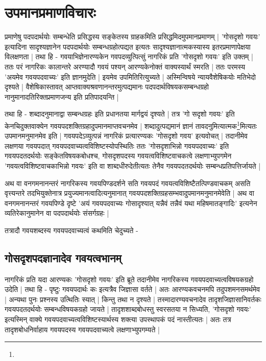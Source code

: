 \section{उपमानप्रमाणविचारः}

प्रमाणेषु पदपदार्थयोः सम्बन्धेति प्रसिद्धस्य सङ्केतस्य ग्राहकमिति प्रसिद्धमिदमुपमानप्रमाणम् | 'गोसदृशो गवयः' इत्यादिना सादृश्यज्ञानेन पदपदार्थयोः सम्बन्धग्रहोत्पद्यत इत्यतः सादृश्यज्ञानात्मकस्यास्य इतरप्रमाणापेक्षया विलक्षणता | तथा हि - गवयाभिज्ञेनारण्यकेन गवपदव्युत्पित्सुं नागरिकं प्रति 'गोसदृशो गवयः' इति उक्तम् | ततः परं नागरिकः कालान्तरे अरण्यादौ गवयं पश्यन् आरण्यकेनोक्तं वाक्यस्यार्थं स्मरति | ततः परमस्य 'अयमेव गवयपदवाच्यः' इति ज्ञानमुदेति | इयमेव उपमितिरित्युच्यते | अस्मिन्विषये न्यायवैशेषिकयोः मतिभेदो दृश्यते | वैशेषिकास्तावत् आप्तवाक्यश्रवणानन्तरमुत्पद्यमानः पदपदार्थविषयकसम्बन्धग्रहो नानुमानादतिरिक्तप्रमाणजन्य इति प्रतिपादयन्ति |

तथा हि - शब्दादनुमानाद्वा सम्बन्धग्रहः इति प्रधानतया मार्गद्वयं दृश्यते | तत्र 'गो सदृशो गवयः' इति केनचिदुक्तवाक्येन गवयपदशक्तिग्रहादुपमानमाप्तवचनमेव | शब्दादुत्पद्यमानं ज्ञानं तावदनुमित्यात्मक\footnote{}मित्यतः उपमानमनुमानमेव इति | गवयपदेऽव्युत्पन्नं नागरिकं प्रत्यारण्यकः 'गोसदृशो गवय' इत्यवोचत् | तदानीमेव लक्षणया गवयपदात् गवयपदवाच्यत्वविशिष्टस्योपस्थितिः ततः  'गोसदृशाभिन्नो गवयपदवाच्यः' इति गवयपदतदर्थयोः सङ्केतविषयकबोधश्च, गोसदृशपदस्य गवयत्वविशिष्टवाचकत्वे लक्षणाभ्युपगमेन 'गवयत्वविशिष्टवाचकाभिन्नो गवयः' इति वा शाब्दधीरुदेतीत्यतः तेनैव गवयपदतदर्थयोः सम्बन्धप्रतिपत्तिर्जायते  |

अथ वा वनगमनानन्तरं नागरिकस्य गवयपिण्डदर्शने सति गवयपदं गवयत्वविशिष्टैतत्पिण्डवाचकम् असति वृत्त्यन्तरे तदभियुक्तेनात्र प्रयुज्यमानत्वादित्यनुमानात् गवयपदशक्तिग्रहसम्भवादुपमानमनुमानमेवेति | अथ वा वनगमनानन्तरं गवयपिण्डे दृष्टे 'अयं गवयपदवाच्यः गोसादृश्यात् यन्नैवं तन्नैवं यथा महिषमातङ्गादिः' इत्यनेन व्यतिरेकानुमानेन वा पदपदार्थयोः संसर्गग्रहः |

तत्रादौ गवयशब्दस्य गवयपदवाच्यत्वं कथमिति चेदुच्यते -

\subsection{गोसदृशपदज्ञानादेव गवयत्वभानम्}

नागरिकं प्रति यदा आरण्यकः 'गोसदृशो गवयः' इति ब्रूते तदानीमेव नागरिकस्य गवयपदवाच्यत्वविषयकग्रहो उदेति | तथा हि - पृष्टुः गवयपदार्थः कः इत्यत्रैव जिज्ञासा वर्तते | अतः आरण्यकवचनमपि तदुपशमनसमर्थमेव | अन्यथा पुनः प्रश्नस्य उत्थितिः स्यात् | किन्तु तथा न दृश्यते | तस्मादारण्यवचनादेव तादृशजिज्ञासानिवर्तकः गवयपदतदर्थयोः सम्बन्धविषयकग्रहो जायते | तादृशशाब्दबोधस्तु स्वरसतया न सिध्यति, 'गोसदृशो गवयः' इत्यस्मिन् वाक्ये गवयपदवाच्यत्वविशिष्टस्यार्थस्य शक्त्या उपस्थापकं पदं नास्तीत्यतः | अतः तत्र तादृशबोधनिर्वाहाय गवयपदस्य गवयपदवाच्यत्वे लक्षणाभ्युपगम्यते | 

